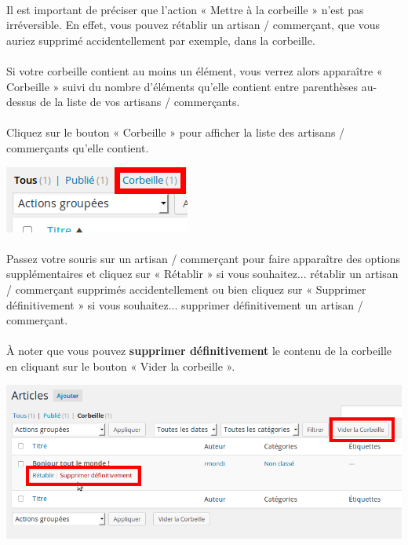 \documentclass[10pt,a4paper]{article}
\begin{document}
\paragraph{}Il est important de préciser que l’action « Mettre à la corbeille » n’est pas irréversible. En effet, vous pouvez rétablir un artisan / commerçant, que vous auriez supprimé accidentellement par exemple, dans la corbeille.
\paragraph{}Si votre corbeille contient au moins un élément, vous verrez alors apparaître « Corbeille » suivi du nombre d’éléments qu’elle contient entre parenthèses au-dessus de la liste de vos artisans / commerçants.
\paragraph{}Cliquez sur le bouton « Corbeille » pour afficher la liste des artisans / commerçants qu’elle contient.
\begin{center}
\includegraphics[scale=0.35]{img/0069.png}
\end{center}
\paragraph{}Passez votre souris sur un artisan / commerçant pour faire apparaître des options supplémentaires et cliquez sur « Rétablir » si vous souhaitez... rétablir un artisan / commerçant supprimés accidentellement ou bien cliquez sur « Supprimer définitivement » si vous souhaitez... supprimer définitivement un artisan / commerçant.
\paragraph{}À noter que vous pouvez \textbf{supprimer définitivement} le contenu de la corbeille en cliquant sur le bouton « Vider la corbeille ».
\begin{center}
\includegraphics[scale=0.35]{img/0070.png}
\end{center}
\newpage
\end{document}

